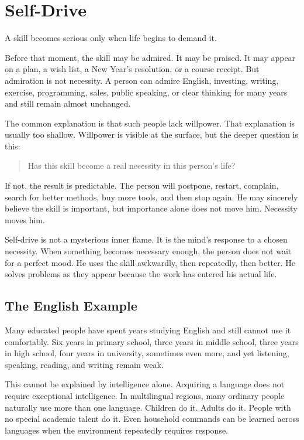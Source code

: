 \chapter{Self-Drive}

A skill becomes serious only when life begins to demand it.

Before that moment, the skill may be admired. It may be praised. It may appear on a plan, a wish list, a New Year's resolution, or a course receipt. But admiration is not necessity. A person can admire English, investing, writing, exercise, programming, sales, public speaking, or clear thinking for many years and still remain almost unchanged.

The common explanation is that such people lack willpower. That explanation is usually too shallow. Willpower is visible at the surface, but the deeper question is this:

\begin{quote}
Has this skill become a real necessity in this person's life?
\end{quote}

If not, the result is predictable. The person will postpone, restart, complain, search for better methods, buy more tools, and then stop again. He may sincerely believe the skill is important, but importance alone does not move him. Necessity moves him.

Self-drive is not a mysterious inner flame. It is the mind's response to a chosen necessity. When something becomes necessary enough, the person does not wait for a perfect mood. He uses the skill awkwardly, then repeatedly, then better. He solves problems as they appear because the work has entered his actual life.

\section*{The English Example}

Many educated people have spent years studying English and still cannot use it comfortably. Six years in primary school, three years in middle school, three years in high school, four years in university, sometimes even more, and yet listening, speaking, reading, and writing remain weak.

This cannot be explained by intelligence alone. Acquiring a language does not require exceptional intelligence. In multilingual regions, many ordinary people naturally use more than one language. Children do it. Adults do it. People with no special academic talent do it. Even household commands can be learned across languages when the environment repeatedly requires response.

